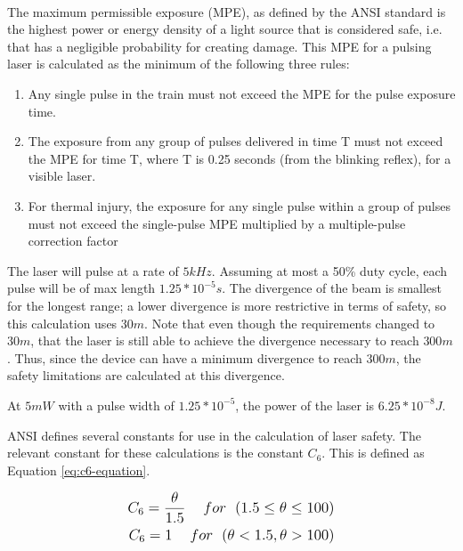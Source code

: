 \documentclass[letterpaper,10pt]{article}
\begin{document}
\begin{spacing}{1.15}
 The maximum permissible exposure (MPE), as defined by the ANSI standard \textsuperscript{\cite{ANSI}} is the highest power or energy density of a light source that is considered safe, i.e. that has a negligible probability for creating damage. This MPE for a pulsing laser is calculated as the minimum of the following three rules:
 
 \begin{enumerate}
 	\item Any single pulse in the train must not exceed the MPE for the pulse exposure time.
 	\item The exposure from any group of pulses delivered in time T must not exceed the MPE for
 	time T, where T is 0.25 seconds (from the blinking reflex), for a visible laser. 
 	\item For thermal injury, the exposure for any single pulse within a group of pulses must not
 	exceed the single-pulse MPE multiplied by a multiple-pulse correction factor
 \end{enumerate}
 
 The laser will pulse at a rate of $5 kHz$. Assuming at most a 50\% duty cycle, each pulse will be of max length $1.25*10^{-5} s$. The divergence of the beam is smallest for the longest range; a lower divergence is more restrictive in terms of safety, so this calculation uses $30m$. Note that even though the requirements changed to $30m$, that the laser is still able to achieve the divergence necessary to reach $300m$. Thus, since the device can have a minimum divergence to reach $300m$, the safety limitations are calculated at this divergence. 
 
 At $5mW$ with a pulse width of $1.25*10^{-5}$, the power of the laser is $6.25*10^{-8} J$. 
 
 ANSI defines several constants for use in the calculation of laser safety. The relevant constant for these calculations is the constant $C_6$. This is defined as Equation \ref{eq:c6-equation}.

 \begin{align} \label{eq:c6-equation} \large \begin{split}
 	C_6 =\frac{\theta}{1.5} \hspace{5mm} for \hspace{2.5mm}(1.5 \leq \theta \leq 100)
	\\
   	C_6 = 1 \hspace{5mm} for \hspace{2.5mm} ( \theta < 1.5, \theta > 100)
   	\end{split}
 \end{align}
  

\end{spacing}
\end{document}
